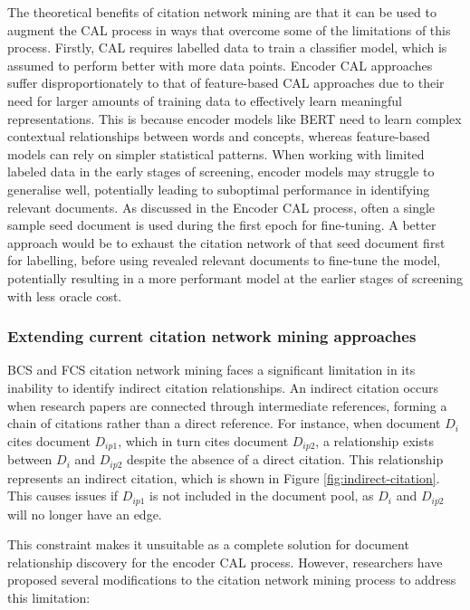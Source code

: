 \documentclass[../main.tex]{subfiles}
\begin{document}
The theoretical benefits of citation network mining are that it can be used to augment the CAL process in ways that overcome some of the limitations of this process.  Firstly, CAL requires labelled data to train a classifier model, which is assumed to perform better with more data points. Encoder CAL approaches suffer disproportionately to that of feature-based CAL approaches due to their need for larger amounts of training data to effectively learn meaningful representations. This is because encoder models like BERT need to learn complex contextual relationships between words and concepts, whereas feature-based models can rely on simpler statistical patterns. When working with limited labeled data in the early stages of screening, encoder models may struggle to generalise well, potentially leading to suboptimal performance in identifying relevant documents. As discussed in the Encoder CAL process, often a single sample seed document is used during the first epoch for fine-tuning. A better approach would be to exhaust the citation network of that seed document first for labelling, before using revealed relevant documents to fine-tune the model, potentially resulting in a more performant model at the earlier stages of screening with less oracle cost. 

\subsubsection{Extending current citation network mining approaches}

BCS and FCS citation network mining faces a significant limitation in its inability to identify indirect citation relationships. An indirect citation occurs when research papers are connected through intermediate references, forming a chain of citations rather than a direct reference. For instance, when document $D_i$ cites document $D_{ip1}$, which in turn cites document $D_{ip2}$, a relationship exists between $D_i$ and $D_{ip2}$ despite the absence of a direct citation. This relationship represents an indirect citation, which is shown in Figure \ref{fig:indirect-citation}. This causes issues if $D_{ip1}$ is not included in the document pool, as $D_i$ and $D_{ip2}$ will no longer have an edge. 

This constraint makes it unsuitable as a complete solution for document relationship discovery for the encoder CAL process. However, researchers have proposed several modifications to the citation network mining process to address this limitation:
\end{document}
